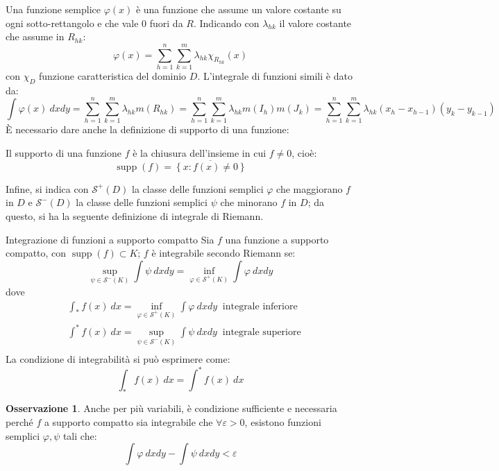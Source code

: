 \documentclass[10pt, a4paper]{scrartcl}
\theoremstyle{definition}
\numberwithin{esempio}{section}
\theoremstyle{definition}
\newtheorem{obs}{Osservazione}
\numberwithin{obs}{section}
\numberwithin{nota}{section}
\numberwithin{equation}{subsection}
\begin{document}
Una funzione semplice $\varphi (x)$ \`e una funzione che assume un valore costante su ogni sotto-rettangolo e che vale $0$ fuori da $R$. Indicando con $\lambda _{hk}$ il valore costante che assume in $R_{hk} $:
\begin{equation}
	\varphi (x)= \sum_{h=1}^{n} \sum_{k=1}^{m} \lambda _{hk} \chi _{R_{hk} } (x)
\end{equation}
con $\chi _D$ funzione caratteristica del dominio $D$. L'integrale di funzioni simili \`e dato da:
\begin{equation}
	\int \varphi (x) \ dxdy = \sum_{h=1}^{n} \sum_{k=1}^{m} \lambda _{hk} m(R_{hk} )= \sum_{h=1}^{n} \sum_{k=1}^{m} \lambda _{hk} m(I_h) m(J_k) = \sum_{h=1}^{n} \sum_{k=1}^{m} \lambda _{hk} (x_h -x_{h-1} ) (y_k - y_{k-1} )
\end{equation}
\`E necessario dare anche la definizione di supporto di una funzione:
\begin{definizione}
	{}{}
	Il supporto di una funzione $f$ \`e la chiusura dell'insieme in cui $f\neq 0$, cio\`e:
	\begin{equation}
		\operatorname{supp} (f) = \overline{\left\{ x : f(x) \neq 0 \right\} }
	\end{equation}
\end{definizione}
\noindent Infine, si indica con $\mathscr{S}^+(D)$ la classe delle funzioni semplici $\varphi $ che maggiorano $f$ in $D$ e $\mathscr{S}^-(D)$ la classe delle funzioni semplici $\psi $ che minorano $f$ in $D$; da questo, si ha la seguente definizione di integrale di Riemann.
\begin{definizione}
	{Integrazione di funzioni a supporto compatto}{}
	Sia $f$ una funzione a supporto compatto, con $\operatorname{supp} (f) \subset K$; $f$ \`e integrabile secondo Riemann se:
	\begin{equation}
		\sup_{\psi \in \mathscr{S}^-(K)}  \int \psi  \ dx dy = \inf_{\varphi \in \mathscr{S}^+(K)}  \int \varphi \ dxdy
	\end{equation}
	dove
	\begin{equation}
		\begin{split}
			&\int_{*} f(x) \ dx =  \inf_{\varphi \in \mathscr{S}^+(K)}  \int \varphi \ dxdy \ \text{ integrale inferiore} \\
			&\int^{*} f(x) \ dx =  \sup_{\psi  \in \mathscr{S}^-(K)}  \int \psi  \ dxdy \ \text{ integrale superiore} \\
		\end{split}
	\end{equation}
	La condizione di integrabilit\`a si pu\`o esprimere come:
	\begin{equation}
		\int_{*} f(x) \ dx= \int^{*} f(x) \ dx
	\end{equation}
\end{definizione}
\begin{obs}
	Anche per pi\`u variabili, \`e condizione sufficiente e necessaria perch\'e $f$ a supporto compatto sia integrabile che $\forall \varepsilon >0$, esistono funzioni semplici $\varphi ,\psi $ tali che:
	\begin{equation}
		\int \varphi  \ dxdy - \int \psi  \ dxdy < \varepsilon 
	\end{equation}
\end{obs}
\end{document}
